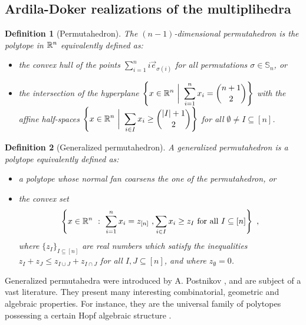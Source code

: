 \documentclass[twoside, 12pt]{amsart}
\newtheorem{definition}{Definition}[section]
\theoremstyle{remark}
\begin{document}

\subsection{Ardila-Doker realizations of the multiplihedra} 
\label{sec:generalizedpermutahedra}

\begin{definition}[Permutahedron] The \emph{$(n-1)$-dimensional permutahedron} is the polytope in $\mathbb{R}^n$ equivalently defined as:
\begin{itemize}[leftmargin=*]
  \item the convex hull of the points $\displaystyle \sum_{i=1}^{n}i\vec e_{\sigma(i)}$ for all permutations $\sigma \in \mathbb{S}_n$, or
  \item the intersection of the hyperplane $\displaystyle  \left\{x \in \RR^n \ \bigg| \ \sum_{i=1}^{n} x_i = \binom{n+1}{2}\right\}$ with the affine half-spaces $\displaystyle \left\{x \in \mathbb{R}^n \ \bigg| \ \sum_{i \in I} x_i \geq \binom{|I|+1}{2}\right\}$ for all $\emptyset\neq I \subseteq [n]$.
\end{itemize}
\end{definition}


\begin{definition}[Generalized permutahedron]
A \emph{generalized permutahedron} is a polytope equivalently defined as:
\begin{itemize}[leftmargin=*]
\item a polytope whose normal fan coarsens the one of the permutahedron, or 
\item the convex set \[ \left\{ x \in \mathbb{R}^n \ : \ \sum_{i=1}^{n}x_i = z_{[n]} \ , \sum_{i \in I} x_i \geq z_I \text{ for all } I \subseteq [n] \right\} \ , \]
where $\{ z_I \}_{I \subseteq [n]}$ are real numbers which satisfy the inequalities $z_I+z_J \leq z_{I\cup J} + z_{I \cap J}$ for all $I,J \subseteq [n]$, and where $z_\emptyset =0$.
\end{itemize}
\end{definition}

Generalized permutahedra were introduced by A. Postnikov \cite{Postnikov09}, and are subject of a vast literature. 
They present many interesting combinatorial, geometric and algebraic properties. 
For instance, they are the universal family of polytopes possessing a certain Hopf algebraic structure \cite{AguiarArdila17}. 
\end{document}
